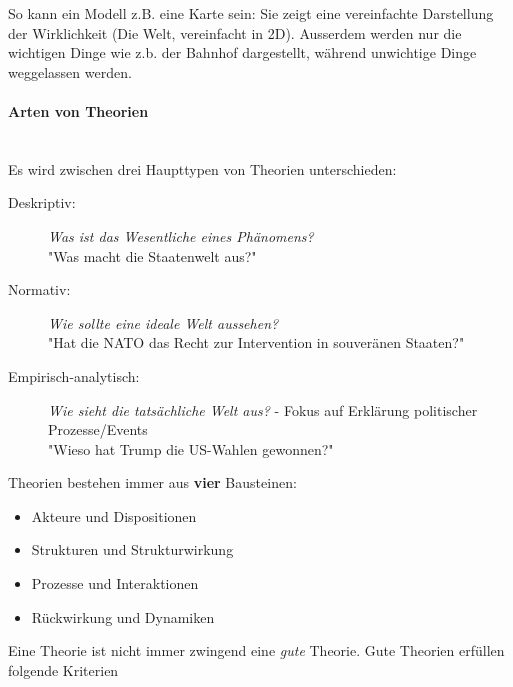 \documentclass[a4paper, 11pt]{article}
\begin{document}
So kann ein Modell z.B. eine Karte sein: Sie zeigt eine vereinfachte Darstellung der Wirklichkeit (Die Welt, vereinfacht in 2D). Ausserdem werden nur die wichtigen Dinge wie z.b. der Bahnhof dargestellt, während unwichtige Dinge weggelassen werden. 

\paragraph{Arten von Theorien} \mbox{}\\
Es wird zwischen drei Haupttypen von Theorien unterschieden: 

\begin{description}
	\item[Deskriptiv: ] \textit{Was ist das Wesentliche eines Phänomens?} \\
	"Was macht die Staatenwelt aus?"
	\item[Normativ: ] \textit{Wie sollte eine ideale Welt aussehen?} \\
	"Hat die NATO das Recht zur Intervention in souveränen Staaten?"
	\item[Empirisch-analytisch: ] \textit{Wie sieht die tatsächliche Welt aus?} - Fokus auf Erklärung politischer Prozesse/Events \\
	"Wieso hat Trump die US-Wahlen gewonnen?"
\end{description}

\vspace{10px}

Theorien bestehen immer aus \textbf{vier} Bausteinen: 

\begin{itemize}
	\item Akteure und Dispositionen
	\item Strukturen und Strukturwirkung
	\item Prozesse und Interaktionen
	\item Rückwirkung und Dynamiken
\end{itemize}


\vspace{10px}

\noindent Eine Theorie ist nicht immer zwingend eine \textit{gute} Theorie. Gute Theorien erfüllen folgende Kriterien
\end{document}

